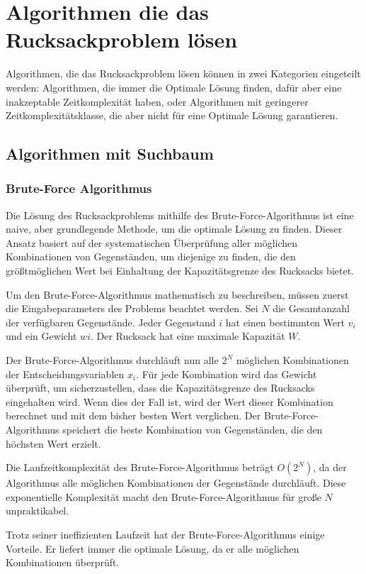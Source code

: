 
\chapter{Algorithmen die das Rucksackproblem lösen}
Algorithmen, die das Rucksackproblem lösen können in zwei Kategorien 
eingeteilt werden: Algorithmen, die immer die Optimale Lösung finden, 
dafür aber eine inakzeptable Zeitkomplexität haben, 
oder Algorithmen mit geringerer Zeitkomplexitätsklasse, die 
aber nicht für eine Optimale Lösung garantieren.

\section{Algorithmen mit Suchbaum}
\subsection{Brute-Force Algorithmus}
Die Lösung des Rucksackproblems mithilfe des 
Brute-Force-Algorithmus ist eine naive, aber grundlegende 
Methode, um die optimale Lösung zu finden. Dieser Ansatz 
basiert auf der systematischen Überprüfung aller möglichen 
Kombinationen von Gegenständen, um diejenige zu finden, die 
den größtmöglichen Wert bei Einhaltung der Kapazitätsgrenze 
des Rucksacks bietet.

Um den Brute-Force-Algorithmus mathematisch zu beschreiben, 
müssen zuerst die Eingabeparameters des Problems beachtet werden. Sei 
$N$ die Gesamtanzahl der verfügbaren Gegenstände. Jeder 
Gegenstand $i$ hat einen bestimmten Wert $v_i$ und ein Gewicht $wi$. 
Der Rucksack hat eine maximale Kapazität $W$.

Der Brute-Force-Algorithmus durchläuft nun alle $2^N$ möglichen 
Kombinationen der Entscheidungsvariablen $x_i$. Für jede 
Kombination wird das Gewicht überprüft, um sicherzustellen, 
dass die Kapazitätsgrenze des Rucksacks eingehalten wird. 
Wenn dies der Fall ist, wird der Wert dieser Kombination 
berechnet und mit dem bisher besten Wert verglichen. Der 
Brute-Force-Algorithmus speichert die beste Kombination von 
Gegenständen, die den höchsten Wert erzielt.

Die Laufzeitkomplexität des Brute-Force-Algorithmus beträgt 
$O(2^N)$, da der Algorithmus alle möglichen Kombinationen der 
Gegenstände durchläuft. Diese exponentielle Komplexität 
macht den Brute-Force-Algorithmus für große $N$ unpraktikabel.

Trotz seiner ineffizienten Laufzeit hat der 
Brute-Force-Algorithmus einige Vorteile. Er liefert immer die 
optimale Lösung, da er alle möglichen Kombinationen überprüft.
